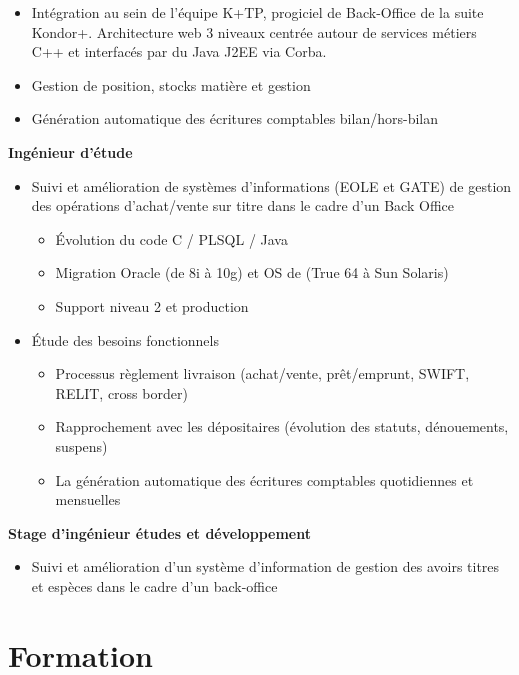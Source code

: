 \documentclass[11pt,a4paper]{moderncv}
\begin{document}
{\bigskip
			\begin{itemize}
				\item Intégration au sein de l’équipe K+TP, progiciel de Back-Office de la suite Kondor+. Architecture web 3 niveaux centrée autour de services métiers C++ et interfacés par du Java J2EE via Corba.
				\item Gestion de position, stocks matière et gestion
				\item Génération automatique des écritures comptables bilan/hors-bilan 
			\end{itemize}
}

\newpage

{
	\bigskip
	\textbf{Ingénieur d'étude}
\bigskip
\begin{itemize}
\item Suivi et amélioration de systèmes d’informations (EOLE et GATE) de gestion des opérations d’achat/vente sur titre dans le cadre d’un Back Office
	\begin{itemize}
		\item Évolution du code C / PLSQL / Java
		\item Migration Oracle (de 8i à 10g) et OS de (True 64 à Sun Solaris)
		\item Support niveau 2 et production
\end{itemize}
\bigskip
\item Étude des besoins fonctionnels
	\begin{itemize}
		\item Processus règlement livraison (achat/vente, prêt/emprunt, SWIFT, RELIT, cross border)
		\item Rapprochement avec les dépositaires (évolution des statuts, dénouements, suspens)
		\item La génération automatique des écritures comptables quotidiennes et mensuelles
	\end{itemize}
\end{itemize}
}
\bigskip
{}
{
\bigskip
\textbf{Stage d’ingénieur études et développement}
\bigskip
\begin{itemize}
	\item Suivi et amélioration d’un système d’information de gestion des avoirs titres et espèces dans le cadre d’un back-office
\end{itemize}
}
\section{Formation}
\end{document}
